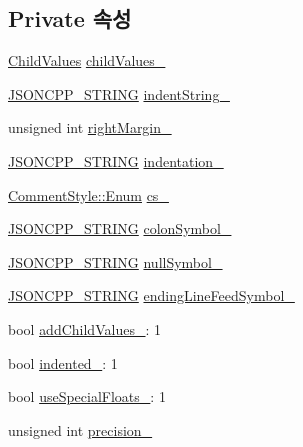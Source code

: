 \subsection*{Private 속성}
\begin{DoxyCompactItemize}
\item 
\hyperlink{struct_json_1_1_built_styled_stream_writer_a63196b38400e5ce452f65ce856d47b6f}{Child\+Values} \hyperlink{struct_json_1_1_built_styled_stream_writer_a47d562d7874c5b1e68995bd62f575792}{child\+Values\+\_\+}
\item 
\hyperlink{json_8h_a1e723f95759de062585bc4a8fd3fa4be}{J\+S\+O\+N\+C\+P\+P\+\_\+\+S\+T\+R\+I\+NG} \hyperlink{struct_json_1_1_built_styled_stream_writer_a0f8115a4fb474ab0e9de25f10e5ca09a}{indent\+String\+\_\+}
\item 
unsigned int \hyperlink{struct_json_1_1_built_styled_stream_writer_a06a51521ccae20397f52fe3036edc602}{right\+Margin\+\_\+}
\item 
\hyperlink{json_8h_a1e723f95759de062585bc4a8fd3fa4be}{J\+S\+O\+N\+C\+P\+P\+\_\+\+S\+T\+R\+I\+NG} \hyperlink{struct_json_1_1_built_styled_stream_writer_aaa4cbad91428ceca37cbabfc2a17a92d}{indentation\+\_\+}
\item 
\hyperlink{struct_json_1_1_comment_style_a51fc08f3518fd81eba12f340d19a3d0c}{Comment\+Style\+::\+Enum} \hyperlink{struct_json_1_1_built_styled_stream_writer_a89a9c76c7531143b52785861ba21c1d4}{cs\+\_\+}
\item 
\hyperlink{json_8h_a1e723f95759de062585bc4a8fd3fa4be}{J\+S\+O\+N\+C\+P\+P\+\_\+\+S\+T\+R\+I\+NG} \hyperlink{struct_json_1_1_built_styled_stream_writer_a9f10991ddef9b77d0b580e24e71483c6}{colon\+Symbol\+\_\+}
\item 
\hyperlink{json_8h_a1e723f95759de062585bc4a8fd3fa4be}{J\+S\+O\+N\+C\+P\+P\+\_\+\+S\+T\+R\+I\+NG} \hyperlink{struct_json_1_1_built_styled_stream_writer_a6ccceadf4b1286a519a175cb59cb61d5}{null\+Symbol\+\_\+}
\item 
\hyperlink{json_8h_a1e723f95759de062585bc4a8fd3fa4be}{J\+S\+O\+N\+C\+P\+P\+\_\+\+S\+T\+R\+I\+NG} \hyperlink{struct_json_1_1_built_styled_stream_writer_a5e61a9a4b2af52b98900286c843b86f7}{ending\+Line\+Feed\+Symbol\+\_\+}
\item 
bool \hyperlink{struct_json_1_1_built_styled_stream_writer_abed9cc31da503b48798e7cea68c42e16}{add\+Child\+Values\+\_\+}\+: 1
\item 
bool \hyperlink{struct_json_1_1_built_styled_stream_writer_a6aa0ad023e623f600103631a6bca6d10}{indented\+\_\+}\+: 1
\item 
bool \hyperlink{struct_json_1_1_built_styled_stream_writer_a6f1b8694b4eb17ab8c34f6d6dd8c8a4a}{use\+Special\+Floats\+\_\+}\+: 1
\item 
unsigned int \hyperlink{struct_json_1_1_built_styled_stream_writer_a6373d8d0ae4741b64e3904e4db0eef46}{precision\+\_\+}
\end{DoxyCompactItemize}



